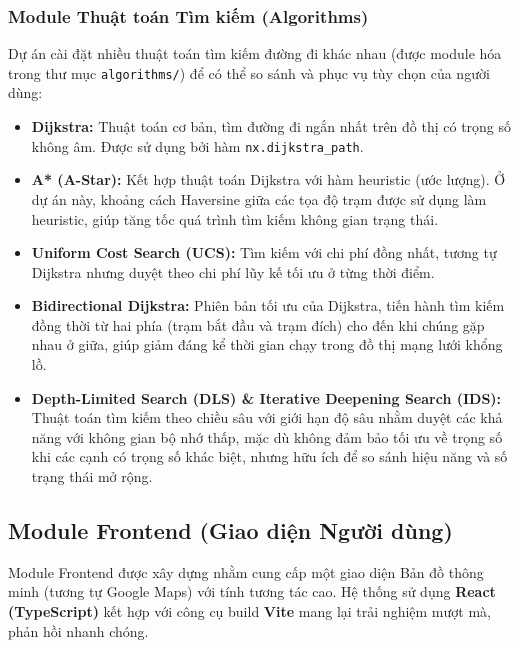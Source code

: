 \documentclass[12pt,a4paper]{article}
\begin{document}
\subsubsection{Module Thuật toán Tìm kiếm (Algorithms)}
Dự án cài đặt nhiều thuật toán tìm kiếm đường đi khác nhau (được module hóa trong thư mục \texttt{algorithms/}) để có thể so sánh và phục vụ tùy chọn của người dùng:
\begin{itemize}
    \item \textbf{Dijkstra:} Thuật toán cơ bản, tìm đường đi ngắn nhất trên đồ thị có trọng số không âm. Được sử dụng bởi hàm \texttt{nx.dijkstra\_path}.
    \item \textbf{A* (A-Star):} Kết hợp thuật toán Dijkstra với hàm heuristic (ước lượng). Ở dự án này, khoảng cách Haversine giữa các tọa độ trạm được sử dụng làm heuristic, giúp tăng tốc quá trình tìm kiếm không gian trạng thái.
    \item \textbf{Uniform Cost Search (UCS):} Tìm kiếm với chi phí đồng nhất, tương tự Dijkstra nhưng duyệt theo chi phí lũy kế tối ưu ở từng thời điểm.
    \item \textbf{Bidirectional Dijkstra:} Phiên bản tối ưu của Dijkstra, tiến hành tìm kiếm đồng thời từ hai phía (trạm bắt đầu và trạm đích) cho đến khi chúng gặp nhau ở giữa, giúp giảm đáng kể thời gian chạy trong đồ thị mạng lưới khổng lồ.
    \item \textbf{Depth-Limited Search (DLS) \& Iterative Deepening Search (IDS):} Thuật toán tìm kiếm theo chiều sâu với giới hạn độ sâu nhằm duyệt các khả năng với không gian bộ nhớ thấp, mặc dù không đảm bảo tối ưu về trọng số khi các cạnh có trọng số khác biệt, nhưng hữu ích để so sánh hiệu năng và số trạng thái mở rộng.
\end{itemize}

\subsection{Module Frontend (Giao diện Người dùng)}

Module Frontend được xây dựng nhằm cung cấp một giao diện Bản đồ thông minh (tương tự Google Maps) với tính tương tác cao. Hệ thống sử dụng \textbf{React (TypeScript)} kết hợp với công cụ build \textbf{Vite} mang lại trải nghiệm mượt mà, phản hồi nhanh chóng.
\end{document}
